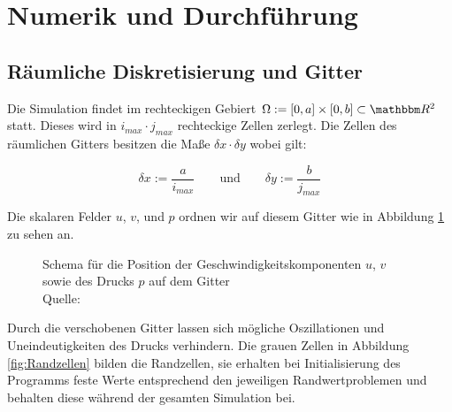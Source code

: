 \section{Numerik und Durchführung} %
\label{sec:numerik_und_durchf_hrung}

	\subsection{Räumliche Diskretisierung und Gitter} %
	\label{sub:r_umliche_diskretisierung_und_gitter}
	
		Die Simulation findet im rechteckigen Gebiert $\Omega:= [0,a]\times [0,b] \subset \SR^2$ statt.
		Dieses wird in $i_{max} \cdot j_{max}$ rechteckige Zellen zerlegt.
		Die Zellen des räumlichen Gitters besitzen die Maße $\delta x \cdot \delta y$  wobei gilt:

		\[ \delta x := \frac{a}{i_{max}} \qquad \text{und} \qquad \delta y := \frac{b}{j_{max}}\]

		Die skalaren Felder $u$, $v$, und $p$ ordnen wir auf diesem Gitter wie in Abbildung \ref{fig:VerschGitter} zu sehen an.

		\begin{figure}[h]
			\center
			\caption{Schema für die Position der Geschwindigkeitskomponenten $u$, $v$ sowie des Drucks $p$ auf dem Gitter \\ Quelle: \cite{nsfd} }
			\label{fig:VerschGitter}
		\end{figure}

		Durch die verschobenen Gitter lassen sich mögliche Oszillationen und Uneindeutigkeiten des Drucks verhindern.
		Die grauen Zellen in Abbildung \ref{fig:Randzellen} bilden die Randzellen, sie erhalten bei Initialisierung des Programms feste Werte entsprechend den jeweiligen Randwertproblemen und behalten diese während der gesamten Simulation bei.

